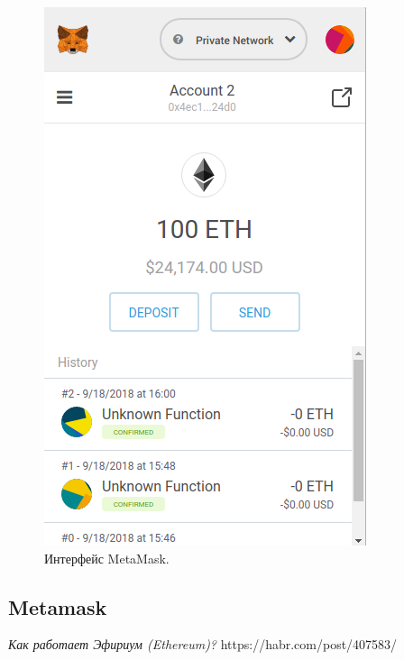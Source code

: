 \documentclass{article}
\begin{document}
\begin{figure}
    \centering
    \includegraphics[scale=0.4]{metamask_1}
    \caption{Интерфейс MetaMask.}
    \label{fig:metamask_1}
\end{figure}

\subsection{Metamask}



\begin{thebibliography}{9}

	  \emph{Как работает Эфириум (Ethereum)?}
	  https://habr.com/post/407583/

\end{thebibliography}
\end{document}
